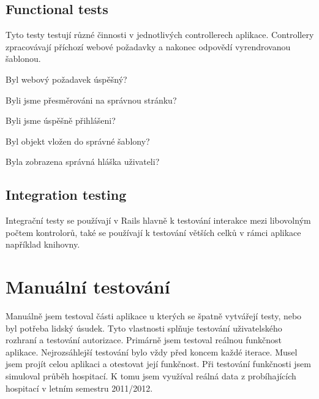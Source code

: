 \subsection{Functional tests}
Tyto testy testují různé činnosti v jednotlivých controllerech aplikace. Controllery zpracovávají příchozí webové požadavky a nakonec odpovědí vyrendrovanou šablonou.

\begin{list}{•}{\textbf{Tento typ testů testuje:}}
\item Byl webový požadavek úspěšný?
\item Byli jsme přesměrováni na správnou stránku?
\item Byli jsme úspěšně přihlášeni?
\item Byl objekt vložen do správné šablony?
\item Byla zobrazena správná hláška uživateli?
\end{list} 

\subsection{Integration testing}
Integrační testy se používají v Rails hlavně k testování interakce mezi libovolným počtem kontrolorů, také se používají k testování větších celků v rámci aplikace například knihovny.

\section{Manuální testování}
Manuálně jsem testoval části aplikace u kterých se špatně vytvářejí  testy, nebo byl potřeba lidský úsudek. Tyto vlastnosti splňuje testování uživatelského rozhraní a testování autorizace. Primárně jsem testoval reálnou funkčnost aplikace. Nejrozsáhlejší testování bylo vždy před koncem každé iterace. Musel jsem projít celou aplikaci a otestovat její funkčnost. 
Při testování funkčnosti jsem simuloval průběh hospitací. K tomu jsem využíval reálná data z probíhajících hospitací v letním semestru 2011/2012.

